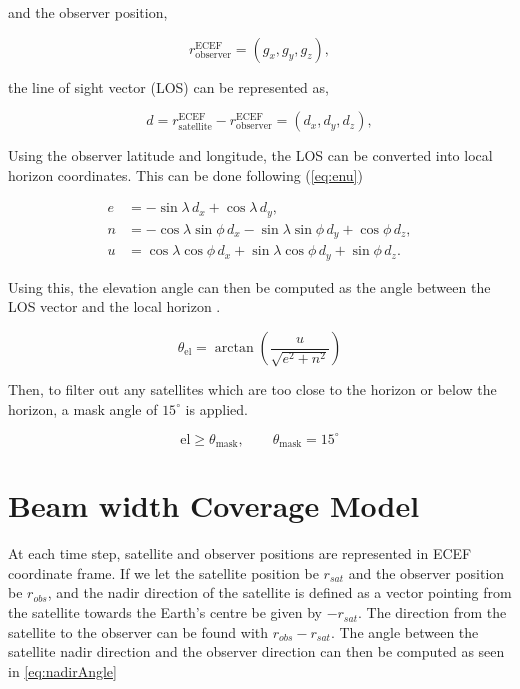 and the observer position, 

\begin{equation}
     r_{\text{observer}}^{\text{ECEF}} = (g_x, g_y, g_z),
\end{equation}

the line of sight vector (LOS) can be represented as,

\begin{equation}
     d = r_{\text{satellite}}^{\text{ECEF}} - r_{\text{observer}}^{\text{ECEF}}= (d_x, d_y, d_z),
\end{equation}

Using the observer latitude and longitude, the LOS can be converted into local horizon coordinates. This can be done following (\ref{eq:enu}) \cite{Navipedia_ECEF_ENU} 

\begin{equation} \label{eq:enu}
\begin{aligned}
e &= -\sin\lambda \, d_x + \cos\lambda \, d_y, \\
n &= -\cos\lambda \sin\phi \, d_x - \sin\lambda \sin\phi \, d_y + \cos\phi \, d_z, \\
u &= \cos\lambda \cos\phi \, d_x + \sin\lambda \cos\phi \, d_y + \sin\phi \, d_z.
\end{aligned}
\end{equation}

Using this, the elevation angle can then be computed as the angle between the LOS vector and the local horizon \cite{Navipedia_ECEF_ENU}. 

\begin{equation}
    \theta_{\text{el}} = \arctan\left( \frac{u}{\sqrt{e^2 + n^2}} \right)
\end{equation}

Then, to filter out any satellites which are too close to the horizon or below the horizon, a mask angle of $15^{\circ}$ is applied. 


\begin{equation}
    \text{el} \geq \theta_{\text{mask}}, \qquad 
    \theta_{\text{mask}} = 15^\circ
\end{equation}

\section{Beam width Coverage Model}  
At each time step, satellite and observer positions are represented in ECEF coordinate frame. If we let the satellite position be $r_{sat}$ and the observer position be $r_{obs}$, and the nadir direction of the satellite is defined as a vector pointing from the satellite towards the Earth's centre be given by $-r_{sat}$. The direction from the satellite to the observer can be found with $r_{obs} - r_{sat}$. The angle between the satellite nadir direction and the observer direction can then be computed as seen in \ref{eq:nadirAngle}

